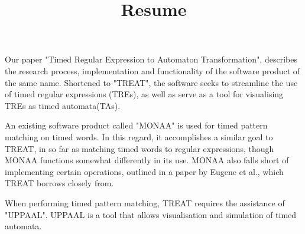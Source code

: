 \documentclass{article}
\begin{document}
\title{Resume}

Our paper "Timed Regular Expression to Automaton Transformation", describes the research process, implementation and functionality of the software product of the same name.
Shortened to "TREAT", the software seeks to streamline the use of timed regular expressions (TREs), as well as serve as a tool for visualising TREs as timed automata(TAs).

An existing software product called "MONAA" is used for timed pattern matching on timed words. In this regard, it accomplishes a similar goal to TREAT, in so far as matching timed words to regular expressions, though MONAA functions somewhat differently in its use.
MONAA also falls short of implementing certain operations, outlined in a paper by Eugene et al.\cite{Eugene2001}, which TREAT borrows closely from.

When performing timed pattern matching, TREAT requires the assistance of "UPPAAL". UPPAAL is a tool that allows visualisation and simulation of timed automata. 
\end{document}
